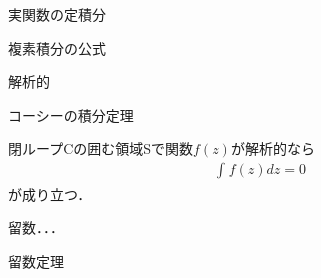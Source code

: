 \documentclass[a4j]{jarticle}
\begin{document}
実関数の定積分


複素積分の公式


解析的

コーシーの積分定理

閉ループCの囲む領域Sで関数$f(z)$が解析的なら
 \begin{align*}
  \int_{ } f(z)dz=0
 \end{align*}
 が成り立つ．




 
 
 留数．．．
 
 留数定理

 
\end{document}
